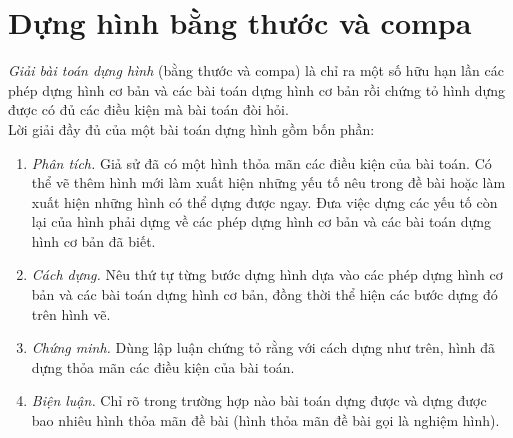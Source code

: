 \section{Dựng hình bằng thước và compa}
\textit{Giải bài toán dựng hình} (bằng thước và compa) là chỉ ra một số hữu hạn lần các phép dựng hình cơ bản và các bài toán dựng hình cơ bản rồi chứng tỏ hình dựng được có đủ các điều kiện mà bài toán đòi hỏi.\\
Lời giải đầy đủ của một bài toán dựng hình gồm bốn phần:
\begin{enumerate}
	\item \textit{Phân tích.} Giả sử đã có một hình thỏa mãn các điều kiện của bài toán. Có thể vẽ thêm hình mới làm xuất hiện những yếu tố nêu trong đề bài hoặc làm xuất hiện những hình có thể dựng được ngay. Đưa việc dựng các yếu tố còn lại của hình phải dựng về các phép dựng hình cơ bản và các bài toán dựng hình cơ bản đã biết.
	\item \textit{Cách dựng.} Nêu thứ tự từng bước dựng hình dựa vào các phép dựng hình cơ bản và các bài toán dựng hình cơ bản, đồng thời thể hiện các bước dựng đó trên hình vẽ.
	\item \textit{Chứng minh.} Dùng lập luận chứng tỏ rằng với cách dựng như trên, hình đã dựng thỏa mãn các điều kiện của bài toán.
	\item \textit{Biện luận.} Chỉ rõ trong trường hợp nào bài toán dựng được và dựng được bao nhiêu hình thỏa mãn đề bài (hình thỏa mãn đề bài gọi là nghiệm hình).\\
\end{enumerate}
